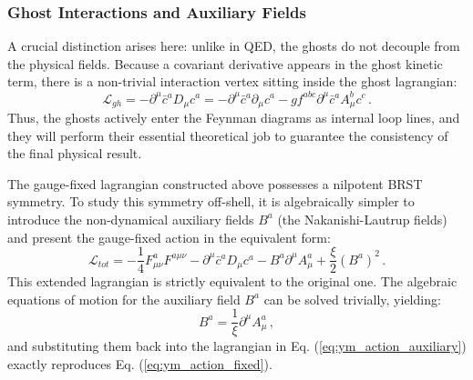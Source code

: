 \subsubsection{Ghost Interactions and Auxiliary Fields}

A crucial distinction arises here: unlike in QED, the ghosts do not decouple from the physical fields. Because a covariant derivative appears in the ghost kinetic term, there is a non-trivial interaction vertex sitting inside the ghost lagrangian:
\begin{equation} \label{eq:ghost_lagrangian}
    \mathcal{L}_{gh} = -\partial^\mu \bar{c}^a D_\mu c^a = -\partial^\mu \bar{c}^a \partial_\mu c^a - g f^{abc} \partial^\mu \bar{c}^a A_\mu^b c^c \, .
\end{equation}
Thus, the ghosts actively enter the Feynman diagrams as internal loop lines, and they will perform their essential theoretical job to guarantee the consistency of the final physical result.

The gauge-fixed lagrangian constructed above possesses a nilpotent BRST symmetry. To study this symmetry off-shell, it is algebraically simpler to introduce the non-dynamical auxiliary fields \(B^a\) (the Nakanishi-Lautrup fields) and present the gauge-fixed action in the equivalent form:
\begin{equation} \label{eq:ym_action_auxiliary}
    \mathcal{L}_{tot} = -\frac{1}{4}F_{\mu\nu}^a F^{a\mu\nu} - \partial^\mu \bar{c}^a D_\mu c^a - B^a \partial^\mu A_\mu^a + \frac{\xi}{2}(B^a)^2 \, .
\end{equation}
This extended lagrangian is strictly equivalent to the original one. The algebraic equations of motion for the auxiliary field \(B^a\) can be solved trivially, yielding:
\begin{equation} \label{eq:auxiliary_eom}
    B^a = \frac{1}{\xi} \partial^\mu A_\mu^a \, ,
\end{equation}
and substituting them back into the lagrangian in Eq. (\ref{eq:ym_action_auxiliary}) exactly reproduces Eq. (\ref{eq:ym_action_fixed}).

